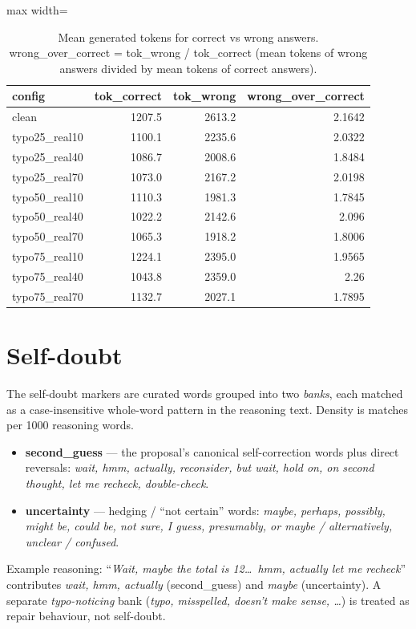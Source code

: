 \documentclass[11pt]{article}
\begin{document}
\begin{table}[H]
\centering
\caption{Mean generated tokens for correct vs wrong answers. wrong\_over\_correct = tok\_wrong / tok\_correct (mean tokens of wrong answers divided by mean tokens of correct answers).}
\small
\begin{adjustbox}{max width=\textwidth}
\begin{tabular}{lrrr}
\toprule
\textbf{config} & \textbf{tok\_correct} & \textbf{tok\_wrong} & \textbf{wrong\_over\_correct} \\
\midrule
clean & 1207.5 & 2613.2 & 2.1642 \\
typo25\_real10 & 1100.1 & 2235.6 & 2.0322 \\
typo25\_real40 & 1086.7 & 2008.6 & 1.8484 \\
typo25\_real70 & 1073.0 & 2167.2 & 2.0198 \\
typo50\_real10 & 1110.3 & 1981.3 & 1.7845 \\
typo50\_real40 & 1022.2 & 2142.6 & 2.096 \\
typo50\_real70 & 1065.3 & 1918.2 & 1.8006 \\
typo75\_real10 & 1224.1 & 2395.0 & 1.9565 \\
typo75\_real40 & 1043.8 & 2359.0 & 2.26 \\
typo75\_real70 & 1132.7 & 2027.1 & 1.7895 \\
\bottomrule
\end{tabular}
\end{adjustbox}
\end{table}

\section*{Self-doubt}
\noindent The self-doubt markers are curated words grouped into two
\emph{banks}, each matched as a case-insensitive whole-word pattern in the reasoning
text. Density is matches per 1000 reasoning words.
\begin{itemize}\setlength{\itemsep}{1pt}
  \item \textbf{second\_guess} --- the proposal's canonical self-correction words plus
  direct reversals: \emph{wait, hmm, actually, reconsider, but wait, hold on, on second
  thought, let me recheck, double-check}.
  \item \textbf{uncertainty} --- hedging / ``not certain'' words: \emph{maybe, perhaps,
  possibly, might be, could be, not sure, I guess, presumably, or maybe / alternatively,
  unclear / confused}.
\end{itemize}
\noindent Example reasoning: ``\emph{Wait, maybe the total is 12\dots\ hmm, actually let
me recheck}'' contributes \emph{wait, hmm, actually} (second\_guess) and \emph{maybe}
(uncertainty). A separate \emph{typo-noticing} bank (\emph{typo, misspelled, doesn't make
sense, \dots}) is treated as repair behaviour, not self-doubt.
\medskip
\end{document}
